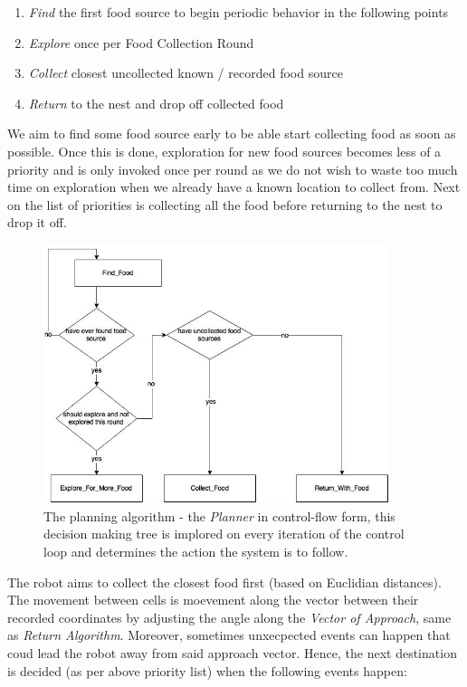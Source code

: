 \documentclass[11pt, a4paper]{article}
\begin{document}
\begin{enumerate}
	\item \textit{Find} the first food source to begin periodic behavior in the following points
	\item \textit{Explore} once per Food Collection Round
	\item \textit{Collect} closest uncollected known / recorded food source
	\item \textit{Return} to the nest and drop off collected food
\end{enumerate}

We aim to find some food source early to be able start collecting food as soon as possible. 
Once this is done, exploration for new food sources becomes less of a priority and is only invoked 
once per round as we do not wish to waste too much time on exploration when we already have
a known location to collect from. Next on the list of priorities is collecting all the food before 
returning to the nest to drop it off.

\begin{figure}[H]
	  \centering
	  \includegraphics[width=0.9\textwidth]{../assets/fig_planner.jpg}
          \caption{The planning algorithm - the \textit{Planner} in control-flow form, this decision making tree is implored on every iteration of the control loop and determines the action the system is to follow.}
\end{figure} 

The robot aims to collect the closest food first (based on Euclidian distances). The movement 
between cells is moevement along the vector between their recorded coordinates by adjusting the 
angle along the \textit{Vector of Approach}, same as \textit{Return Algorithm}\cite{task2_report}. 
Moreover, sometimes unxecpected events can happen that coud lead the robot away from said approach 
vector. Hence, the next destination is decided (as per above priority list) when the following 
events happen:
\end{document}
